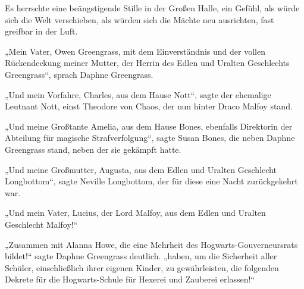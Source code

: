 Es herrschte eine beängstigende Stille in der Großen Halle, ein Gefühl, als würde sich die Welt verschieben, als würden sich die Mächte neu ausrichten, fast greifbar in der Luft.

„Mein Vater, Owen Greengrass, mit dem Einverständnis und der vollen Rückendeckung meiner Mutter, der Herrin des Edlen und Uralten Geschlechts Greengrass“, sprach Daphne Greengrass.

„Und mein Vorfahre, Charles, aus dem Hause Nott“, sagte der ehemalige Leutnant Nott, einst Theodore von Chaos, der nun hinter Draco Malfoy stand.

„Und meine Großtante Amelia, aus dem Hause Bones, ebenfalls Direktorin der Abteilung für magische Strafverfolgung“, sagte Susan Bones, die neben Daphne Greengrass stand, neben der sie gekämpft hatte.

„Und meine Großmutter, Augusta, aus dem Edlen und Uralten Geschlecht Longbottom“, sagte Neville Longbottom, der für diese eine Nacht zurückgekehrt war.

„Und mein Vater, Lucius, der Lord Malfoy, aus dem Edlen und Uralten Geschlecht Malfoy!“

„Zusammen mit Alanna Howe, die eine Mehrheit des Hogwarts-Gouverneursrats bildet!“ sagte Daphne Greengrass deutlich. „haben, um die Sicherheit aller Schüler, einschließlich ihrer eigenen Kinder, zu gewährleisten, die folgenden Dekrete für die Hogwarts-Schule für Hexerei und Zauberei erlassen!“

